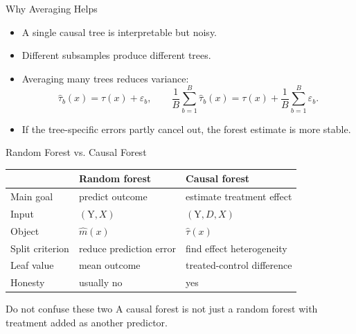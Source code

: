 \documentclass[hyperref={pdfpagelabels=false}]{beamer}
\begin{document}
\begin{frame}{Why Averaging Helps}
\begin{itemize}
  \item A single causal tree is interpretable but noisy.
  \vspace{0.2cm}
  \item Different subsamples produce different trees.
  \vspace{0.2cm}
  \item Averaging many trees reduces variance:
  \[
    \hat{\tau}_b(x)=\tau(x)+\varepsilon_b,
    \qquad
    \frac{1}{B}\sum_{b=1}^B \hat{\tau}_b(x)
    =
    \tau(x)+\frac{1}{B}\sum_{b=1}^B \varepsilon_b.
  \]
  \vspace{0.2cm}
  \item If the tree-specific errors partly cancel out, the forest estimate is more stable.
\end{itemize}
\end{frame}

\begin{frame}{Random Forest vs. Causal Forest}
\begin{center}
\small
\begin{tabular}{lll}
\toprule
 & Random forest & Causal forest \\
\midrule
Main goal & predict outcome & estimate treatment effect \\
Input & $(\mathrm{Y},X)$ & $(\mathrm{Y},D,X)$ \\
Object & $\hat{m}(x)$ & $\hat{\tau}(x)$ \\
Split criterion & reduce prediction error & find effect heterogeneity \\
Leaf value & mean outcome & treated-control difference \\
Honesty & usually no & yes \\
\bottomrule
\end{tabular}
\end{center}

\vspace{0.3cm}
\begin{block}{Do not confuse these two}
A causal forest is not just a random forest with treatment added as another predictor.
\end{block}
\end{frame}
\end{document}
